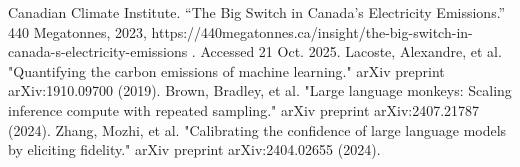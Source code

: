 \documentclass[conference]{IEEEtran}
\begin{document}
\begin{thebibliography}{00}
             Canadian Climate Institute. “The Big Switch in Canada’s Electricity Emissions.” 440 Megatonnes, 2023, https://440megatonnes.ca/insight/the-big-switch-in-canada-s-electricity-emissions
. Accessed 21 Oct. 2025.
             Lacoste, Alexandre, et al. "Quantifying the carbon emissions of machine learning." arXiv preprint arXiv:1910.09700 (2019).
             Brown, Bradley, et al. "Large language monkeys: Scaling inference compute with repeated sampling." arXiv preprint arXiv:2407.21787 (2024).
             Zhang, Mozhi, et al. "Calibrating the confidence of large language models by eliciting fidelity." arXiv preprint arXiv:2404.02655 (2024).
            
         
	\end{thebibliography}
	
	
\end{document}
